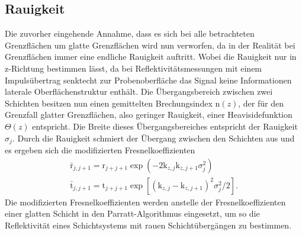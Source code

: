 \subsection{Rauigkeit}
\label{subsec:rauigkeit}
Die zuvorher eingehende
Annahme, dass es sich bei alle betrachteten
Grenzflächen um
glatte Grenzflächen wird nun verworfen, da in
der Realität bei Grenzflächen immer
eine endliche Rauigkeit auftritt.
Wobei die Rauigkeit nur in z-Richtung bestimmen lässt,
da bei Reflektivitätsmessungen mit einem
Impulsübertrag senktecht zur Probenoberfläche
das Signal
keine Informationen laterale Oberflächenstruktur
enthält. Die Übergangsbereich zwischen
zwei Schichten besitzen
nun einen gemittelten Brechungsindex
$\mathrm{n}(z)$, der für den Grenzfall
glatter Grenzflächen, also geringer Rauigkeit,
einer Heavisidefunktion $\Theta(z)$ entspricht.
Die Breite dieses Übergangsbereiches
entspricht der Rauigkeit $\sigma_j$.
Durch die Rauigkeit schmiert der Übergang
zwischen den Schichten aus und es ergeben sich die
modifizierten Fresnelkoeffizienten
\begin{align}
\bar{\mathrm{r}}_{j,j+1} = \mathrm{r}_{j+j+1} \exp\left(-2\mathrm{k}_{z,j}\mathrm{k}_{z,j+1}\sigma^2_j\right)  \\
\bar{\mathrm{t}}_{j,j+1} = \mathrm{t}_{j+j+1} \exp\left[\left(\mathrm{k}_{z,j}-\mathrm{k}_{z,j+1}\right)^2\sigma^2_j/2\right].
\end{align}
Die modifizierten Fresnelkoeffizienten werden
anstelle der Fresnelkoeffizienten einer glatten
Schicht in den Parratt-Algorithmus eingesetzt,
um so die Reflektivität eines
Schichtsystems mit rauen Schichtübergängen
zu bestimmen.











\cite{sample}
